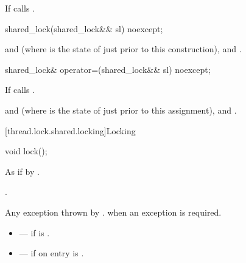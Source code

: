 \begin{itemdescr}
\pnum
\effects If  calls .
\end{itemdescr}

%
\begin{itemdecl}
shared_lock(shared_lock&& sl) noexcept;
\end{itemdecl}

\begin{itemdescr}
\pnum
\ensures {} and  (where
 is the state of  just prior to this construction),
 and .
\end{itemdescr}

%
\begin{itemdecl}
shared_lock& operator=(shared_lock&& sl) noexcept;
\end{itemdecl}

\begin{itemdescr}
\pnum
\effects If  calls .

\pnum
\ensures {} and  (where
 is the state of  just prior to this assignment),
 and .
\end{itemdescr}

[thread.lock.shared.locking]{Locking}

%
\begin{itemdecl}
void lock();
\end{itemdecl}

\begin{itemdescr}
\pnum
\effects As if by .

\pnum
\ensures {}.

\pnum
\throws Any exception thrown by .
 when an exception is required.

\pnum
\errors
\begin{itemize}
\item {} --- if  is .
\item {} --- if on entry  is
.
\end{itemize}
\end{itemdescr}

